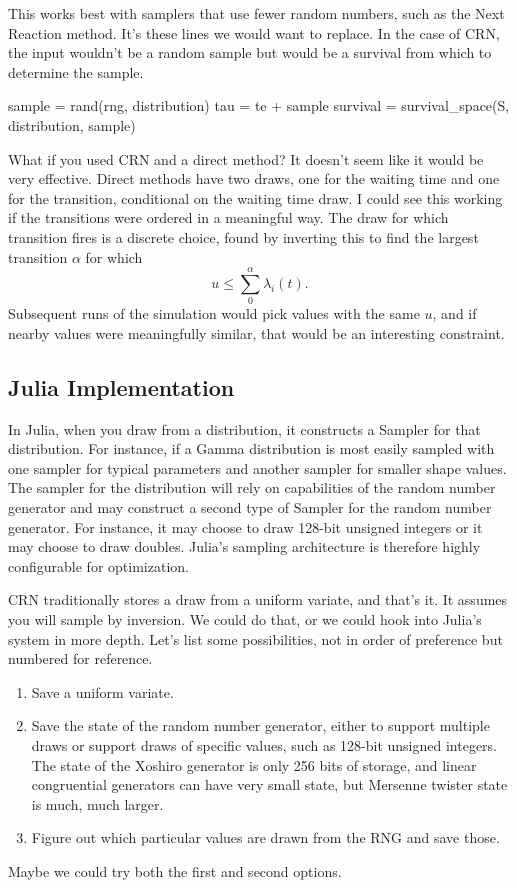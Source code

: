 \documentclass{article}
\begin{document}
This works best with samplers that use fewer random numbers, such as the Next Reaction method. It's these lines we would want to replace. In the case of CRN, the input wouldn't be a random sample but would be a survival from which to determine the sample.

\begin{jllisting}
sample = rand(rng, distribution)
tau = te + sample
survival = survival_space(S, distribution, sample)
\end{jllisting}

What if you used CRN and a direct method? It doesn't seem like it would be very effective. Direct methods have two draws, one for the waiting time and one for the transition, conditional on the waiting time draw. I could see this working if the transitions were ordered in a meaningful way. The draw for which transition fires is a discrete choice, found by inverting this to find the largest transition $\alpha$ for which
\begin{equation}
	u \le \sum_{0}^{\alpha}\lambda_i(t).
\end{equation}
Subsequent runs of the simulation would pick values with the same $u$, and if nearby values were meaningfully similar, that would be an interesting constraint.

\subsection{Julia Implementation}

In Julia, when you draw from a distribution, it constructs a Sampler for that distribution. For instance, if a Gamma distribution is most easily sampled with one sampler for typical parameters and another sampler for smaller shape values. The sampler for the distribution will rely on capabilities of the random number generator and may construct a second type of Sampler for the random number generator. For instance, it may choose to draw 128-bit unsigned integers or it may choose to draw doubles. Julia's sampling architecture is therefore highly configurable for optimization.

CRN traditionally stores a draw from a uniform variate, and that's it. It assumes you will sample by inversion. We could do that, or we could hook into Julia's system in more depth. Let's list some possibilities, not in order of preference but numbered for reference.
\begin{enumerate}
	\item Save a uniform variate.
	\item Save the state of the random number generator, either to support multiple draws or support draws of specific values, such as 128-bit unsigned integers. The state of the Xoshiro generator is only 256 bits of storage, and linear congruential generators can have very small state, but Mersenne twister state is much, much larger.
	\item Figure out which particular values are drawn from the RNG and save those.
\end{enumerate}
Maybe we could try both the first and second options.
\end{document}
